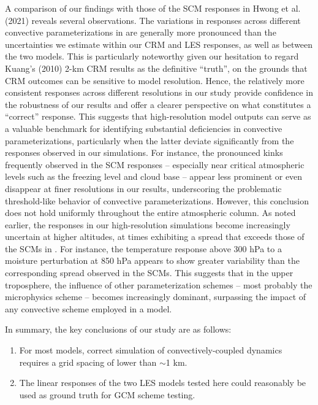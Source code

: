 \documentclass[draft]{agujournal2019}
\begin{document}
A comparison of our findings with those of the SCM responses in Hwong et al.
(2021) reveals several observations. The variations in responses across
different convective parameterizations in  are generally
more pronounced than the uncertainties we estimate within our CRM and LES
responses, as well as between the two models. This is particularly noteworthy
given our hesitation to regard Kuang's (2010) 2-km CRM results as the definitive
``truth'', on the grounds that CRM outcomes can be sensitive to model
resolution. Hence, the relatively more consistent responses across different
resolutions in our study provide confidence in the robustness of our results and
offer a clearer perspective on what constitutes a ``correct'' response. This
suggests that high-resolution model outputs can serve as a valuable benchmark
for identifying substantial deficiencies in convective parameterizations,
particularly when the latter deviate significantly from the responses observed
in our simulations. For instance, the pronounced kinks frequently observed in
the SCM responses -- especially near critical atmospheric levels such as the
freezing level and cloud base -- appear less prominent or even disappear at
finer resolutions in our results, underscoring the problematic threshold-like
behavior of convective parameterizations. However, this conclusion does not hold
uniformly throughout the entire atmospheric column. As noted earlier, the
responses in our high-resolution simulations become increasingly uncertain at
higher altitudes, at times exhibiting a spread that exceeds those of the SCMs in
. For instance, the temperature response above 300 hPa
to a moisture perturbation at 850 hPa appears to show greater variability than
the corresponding spread observed in the SCMs. This suggests that in the upper
troposphere, the influence of other parameterization schemes -- most probably
the microphysics scheme -- becomes increasingly dominant, surpassing the impact
of any convective scheme employed in a model.

In summary, the key conclusions of our study are as follows:

\begin{enumerate}
    \item For most models, correct simulation of convectively-coupled dynamics
    requires a grid spacing of lower than $\sim$1 km.
    \item The linear responses of the two LES models tested here could
    reasonably be used as ground truth for GCM scheme testing.
\end{enumerate}
\end{document}
